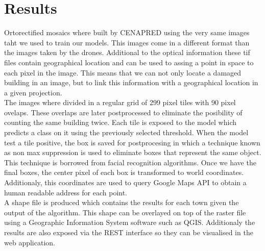 \section{Results}

Ortorectified mosaics where built by CENAPRED using the very same images taht we used to train our models. This images come in a different format than the images taken by the drones. Additional to the optical information these tif files contain geographical location and can be used to assing a point in space to each pixel in the image. This means that we can not only locate a damaged building in an image, but to link this information with a geographical location in a given projection.\\

The images where divided in a regular grid of 299 pixel tiles with 90 pixel ovelaps. These overlaps are later postprocessed to eliminate the posibility of counting the same building twice. Each tile is exposed to the model which predicts a class on it using the previously selected threshold. When the model test a tile positive, the box is saved for postprocesing in which a technique known as non max suppression is used to eliminate boxes that represent the same object. This technique is borrowed from facial recognition algorithms. Once we have the final boxes, the center pixel of each box is transformed to world coordinates. Additionaly, this coordinates are used to query Google Maps API to obtain a human readable address for each point.\\

A shape file is produced which contains the results for each town given the output of the algorithm. This shape can be overlayed on top of the raster file using a Geographic Information System software such as QGIS. Additionaly the results are also exposed via the REST interface so they can be visualised in the web application.\\













